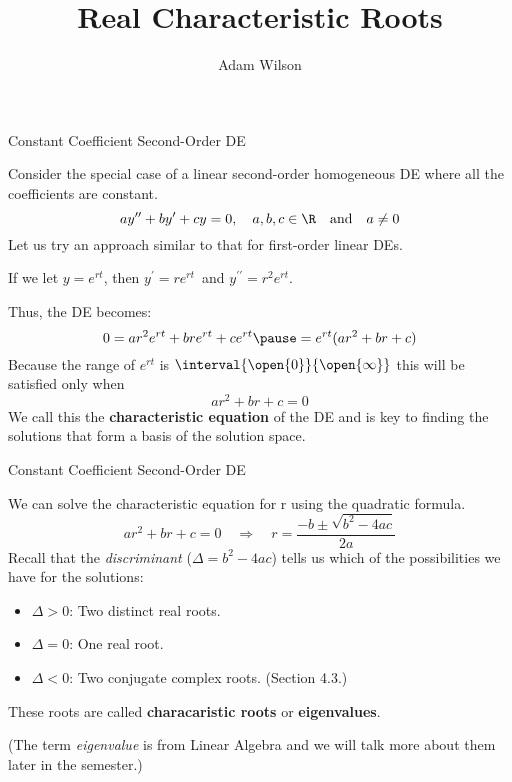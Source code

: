 \documentclass{beamer}
\title[MATH 2250 - Section 4.2]{Real Characteristic Roots}
\author{Adam Wilson}
\institute{Salt Lake Community College}
\date{}
\begin{document}
\begin{frame}
  \titlepage
\end{frame}

\begin{frame}{Constant Coefficient Second-Order DE}
\begin{block}{}
Consider the special case of a linear second-order homogeneous DE where all the coefficients are constant.
\begin{equation*}
ay^{\prime\prime}+by^{\prime}+cy=0,
\quad a,b,c\in\R
\quad\text{and}\quad a\neq 0
\end{equation*}\pause
Let us try an approach similar to that for first-order linear DEs.\pause

If we let $y=e^{rt}$\pause, then $y^\prime=re^{rt}$\pause\  and $y^{\prime\prime}=r^2e^{rt}$.\pause

Thus, the DE becomes:
\begin{equation*}
0=ar^2e^{rt}+bre^{rt}+ce^{rt}\pause=e^{rt}(ar^2+br+c)
\end{equation*}\pause
Because the range of $e^{rt}$ is $\interval{\open{0}}{\open{\infty}}$ this will be satisfied only when
\begin{equation*}
ar^2+br+c=0
\end{equation*}
We call this the \textbf{characteristic equation} of the DE and is key to finding the solutions that form a basis of the solution space.
\end{block}
\end{frame}

\begin{frame}{Constant Coefficient Second-Order DE}
\begin{block}{}
We can solve the characteristic equation for r using the quadratic formula.
\begin{equation*}
ar^2+br+c=0
\quad\Rightarrow\quad
r=\dfrac{-b\pm\sqrt{b^2-4ac}}{2a}
\end{equation*}\pause
Recall that the \emph{discriminant} ($\Delta=b^2-4ac$) tells us which of the possibilities we have for the solutions:
\begin{itemize}[<+- | alert@+>]
\item $\Delta>0$: Two distinct real roots.
\item $\Delta=0$: One real root.
\item $\Delta<0$: Two conjugate complex roots. (Section 4.3.)
\end{itemize}
\onslide<+->
These roots are called \textbf{characaristic roots} or \textbf{eigenvalues}. 

(The term \emph{eigenvalue} is from Linear Algebra and we will talk more about them later in the semester.)
\end{block}
\end{frame}
\end{document}
